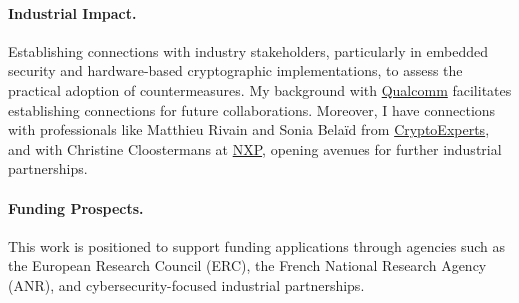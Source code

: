 \documentclass[11pt, a4paper]{article}
\begin{document}
\paragraph{Industrial Impact.} Establishing connections with industry stakeholders, particularly in 
embedded security and hardware-based cryptographic implementations, to assess the practical adoption of 
countermeasures. My background with \href{https://www.qualcomm.com/}{Qualcomm} facilitates establishing 
connections for future collaborations. Moreover, I have connections with professionals like Matthieu Rivain 
and Sonia Belaïd from \href{https://www.cryptoexperts.com/people/}{CryptoExperts}, and with Christine 
Cloostermans at \href{https://www.nxp.com/company/about-nxp/smarter-world-blog/BL-EMBRACING-EQUITY-ON-EVERY-LEVEL}{NXP}, 
opening avenues for further industrial partnerships.

\paragraph{Funding Prospects.} This work is positioned to support funding applications through agencies such as 
the European Research Council (ERC), the French National Research Agency (ANR), and 
cybersecurity-focused industrial partnerships.






\end{document}
